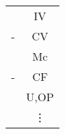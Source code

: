 
\begin{table}[h]
\Large
\center
	\begin{tabular}{rc}
	 & IV \\
	- & CV \\ \hline
	& Mc	\\
	-& CF	\\ \hline
	& U,OP \\
	& \vdots
	\end{tabular}
\end{table}

